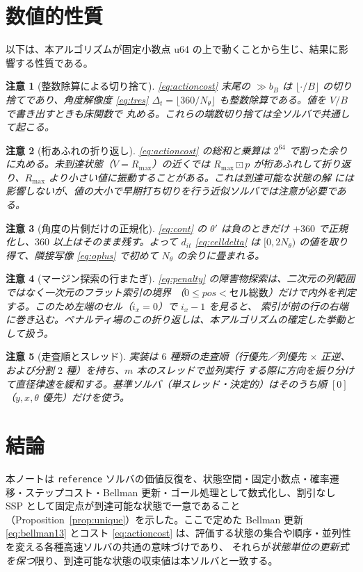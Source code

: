 \documentclass[11pt]{ltjsarticle}
\newtheorem{remark}{注意}
\newcommand{\wmul}{\mathbin{\boxdot}}
\newcommand{\Rmax}{R_{\max}}        %
\begin{document}
\section{数値的性質}
\label{sec:remarks}

以下は、本アルゴリズムが固定小数点 u64 の上で動くことから生じ、結果に影響する性質である。

\begin{remark}[整数除算による切り捨て]
\label{rem:intdiv}
\eqref{eq:actioncost} 末尾の $\gg b_B$ は $\lfloor\cdot/B\rfloor$ の切り捨てであり、角度解像度
\eqref{eq:tres} $\Delta_t=\lfloor360/N_\theta\rfloor$ も整数除算である。値を $V/B$ で書き出すときも床関数で
丸める。これらの端数切り捨ては全ソルバで共通して起こる。
\end{remark}

\begin{remark}[桁あふれの折り返し]
\label{rem:wrap}
\eqref{eq:actioncost} の総和と乗算は $2^{64}$ で割った余りに丸める。未到達状態（$V=\Rmax$）の近くでは
$\Rmax\wmul p$ が桁あふれして折り返り、$\Rmax$ より小さい値に振動することがある。これは到達可能な状態の解
には影響しないが、値の大小で早期打ち切りを行う近似ソルバでは注意が必要である。
\end{remark}

\begin{remark}[角度の片側だけの正規化]
\label{rem:theta}
\eqref{eq:cont} の $\theta'$ は負のときだけ $+360$ で正規化し、$360$ 以上はそのまま残す。よって
$d_{it}$ \eqref{eq:celldelta} は $[0,2N_\theta)$ の値を取り得て、隣接写像 \eqref{eq:oplus} で初めて
$N_\theta$ の余りに畳まれる。
\end{remark}

\begin{remark}[マージン探索の行またぎ]
\label{rem:margin}
\eqref{eq:penalty} の障害物探索は、二次元の列範囲ではなく\emph{一次元のフラット索引}の境界
（$0\le pos<\text{セル総数}$）だけで内外を判定する。このため左端のセル（$i_x=0$）で $i_x-1$ を見ると、
索引が前の行の右端に巻き込む。ペナルティ場のこの折り返しは、本アルゴリズムの確定した挙動として扱う。
\end{remark}

\begin{remark}[走査順とスレッド]
\label{rem:sweep}
実装は $6$ 種類の走査順（行優先／列優先 $\times$ 正逆、および分割 $2$ 種）を持ち、$m$ 本のスレッドで並列実行
する際に方向を振り分けて直径律速を緩和する。基準ソルバ（単スレッド・決定的）はそのうち順 $[0]$
（$y,x,\theta$ 優先）だけを使う。
\end{remark}

\section{結論}
本ノートは \texttt{reference} ソルバの価値反復を、状態空間・固定小数点・確率遷移・ステップコスト・Bellman
更新・ゴール処理として数式化し、割引なし SSP として固定点が到達可能な状態で一意であること
（Proposition~\ref{prop:unique}）を示した。ここで定めた Bellman 更新 \eqref{eq:bellman13} とコスト
\eqref{eq:actioncost} は、評価する状態の集合や順序・並列性を変える各種高速ソルバの共通の意味づけであり、
それらが\emph{状態単位の更新式を保つ}限り、到達可能な状態の収束値は本ソルバと一致する。
\end{document}
